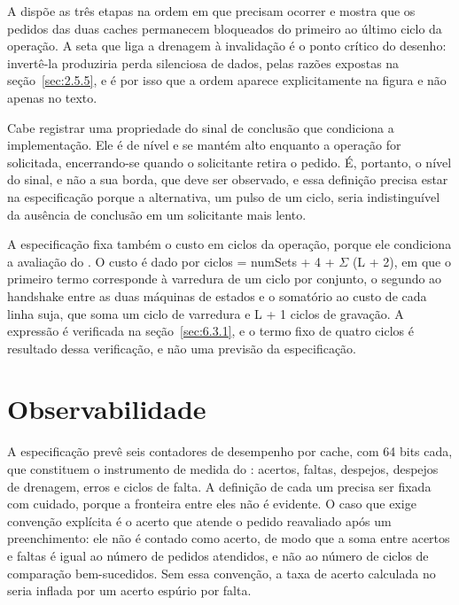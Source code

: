 A  dispõe as três etapas na ordem em que precisam ocorrer e mostra que os pedidos das duas caches permanecem bloqueados do primeiro ao último ciclo da operação. A seta que liga a drenagem à invalidação é o ponto crítico do desenho: invertê-la produziria perda silenciosa de dados, pelas razões expostas na seção~\ref{sec:2.5.5}, e é por isso que a ordem aparece explicitamente na figura e não apenas no texto.


Cabe registrar uma propriedade do sinal de conclusão que condiciona a implementação. Ele é de nível e se mantém alto enquanto a operação for solicitada, encerrando-se quando o solicitante retira o pedido. É, portanto, o nível do sinal, e não a sua borda, que deve ser observado, e essa definição precisa estar na especificação porque a alternativa, um pulso de um ciclo, seria indistinguível da ausência de conclusão em um solicitante mais lento.

A especificação fixa também o custo em ciclos da operação, porque ele condiciona a avaliação do . O custo é dado por ciclos = numSets + 4 + $\Sigma$ (L + 2), em que o primeiro termo corresponde à varredura de um ciclo por conjunto, o segundo ao handshake entre as duas máquinas de estados e o somatório ao custo de cada linha suja, que soma um ciclo de varredura e L + 1 ciclos de gravação. A expressão é verificada na seção~\ref{sec:6.3.1}, e o termo fixo de quatro ciclos é resultado dessa verificação, e não uma previsão da especificação.

\section{Observabilidade}\label{sec:4.9}

A especificação prevê seis contadores de desempenho por cache, com 64 bits cada, que constituem o instrumento de medida do : acertos, faltas, despejos, despejos de drenagem, erros e ciclos de falta. A definição de cada um precisa ser fixada com cuidado, porque a fronteira entre eles não é evidente. O caso que exige convenção explícita é o acerto que atende o pedido reavaliado após um preenchimento: ele não é contado como acerto, de modo que a soma entre acertos e faltas é igual ao número de pedidos atendidos, e não ao número de ciclos de comparação bem-sucedidos. Sem essa convenção, a taxa de acerto calculada no  seria inflada por um acerto espúrio por falta.

